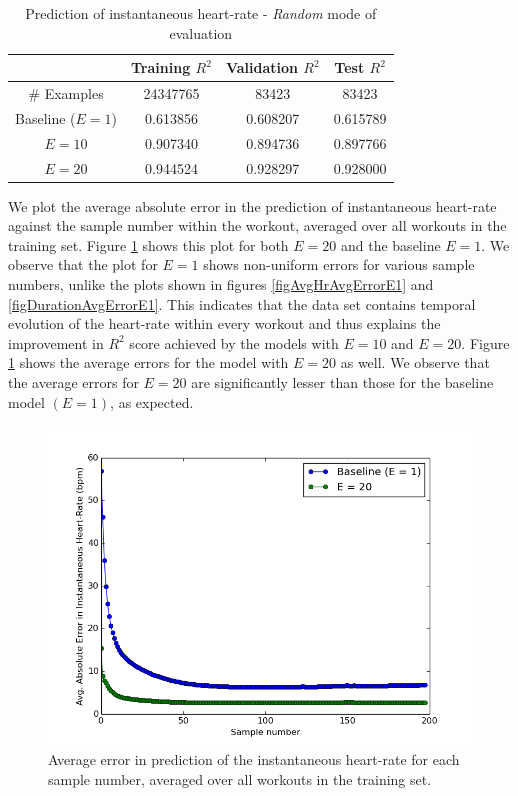 \documentclass{acm_proc_article-sp}
\begin{document}
\begin{table}[H]
\centering
\begin{tabular}{|c|c|c|c|} \hline
& Training $R^2$ & Validation $R^2$ & Test $R^2$ \\ \hline
\# Examples & 24347765  & 83423  & 83423  \\ \hline
Baseline ($E = 1$) & 0.613856 & 0.608207 & 0.615789 \\ \hline
$E = 10$ & 0.907340 & 0.894736 & 0.897766 \\ \hline
$E = 20$ & 0.944524 & 0.928297 & 0.928000 \\ \hline
\end{tabular}
\caption{Prediction of instantaneous heart-rate - \emph{Random} mode of evaluation }
\label{tableInstHrRandom}
\end{table}

We plot the average absolute error in the prediction of instantaneous heart-rate against the sample number within the workout, averaged over all workouts in the training set. Figure \ref{figInstHrErrorVsSample} shows this plot for both $E = 20$ and the baseline $E = 1$. We observe that the plot for $E = 1$ shows non-uniform errors for various sample numbers, unlike the plots shown in figures \ref{figAvgHrAvgErrorE1} and \ref{figDurationAvgErrorE1}. This indicates that the data set contains temporal evolution of the heart-rate within every workout and thus explains the improvement in $R^2$ score achieved by the models with $E = 10$ and $E = 20$. Figure \ref{figInstHrErrorVsSample} shows the average errors for the model with $E = 20$ as well. We observe that the average errors for $E = 20$ are significantly lesser than those for the baseline model $(E = 1)$, as expected.

\begin{figure}[h]
\centering
\includegraphics[scale=0.4]{../src/plots/insthr_error_vs_sample_comparison}
\caption{\label{figInstHrErrorVsSample} Average error in prediction of the instantaneous heart-rate for each sample number, averaged over all workouts in the training set.}
\end{figure}
\end{document}
